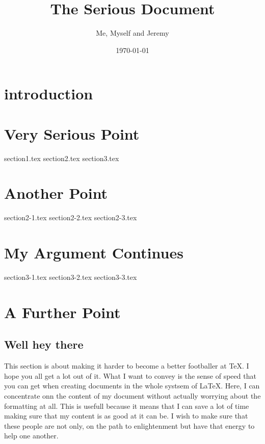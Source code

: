 \documentclass[a4paper]{report}
\title{The Serious Document}
\author{Me, Myself and Jeremy}
\date{\today}
\begin{document}
\maketitle

\pagebreak

\begin{abstract}

\end{abstract}

\chapter{introduction}


\chapter{Very Serious Point}
{section1.tex}
{section2.tex}
{section3.tex}

\chapter{Another Point}
{section2-1.tex}
{section2-2.tex}
{section2-3.tex}

\chapter{My Argument Continues}
{section3-1.tex}
{section3-2.tex}
{section3-3.tex}

\chapter{A Further Point}
\section{Well hey there}
This section is about making it harder to become a better footballer at \TeX. I hope you all get a lot out of it. What I want to convey is the sense of speed that you can get when creating documents in the whole systsem of \LaTeX. Here, I can concentrate onn the content of my document without actually worrying about the formatting at all. This is usefull because it means that I can save a lot of time making sure that my content is as good at it can be. I wish to make sure that these people are not only, on the path to enlightenment but have that energy to help one another.
\end{document}
